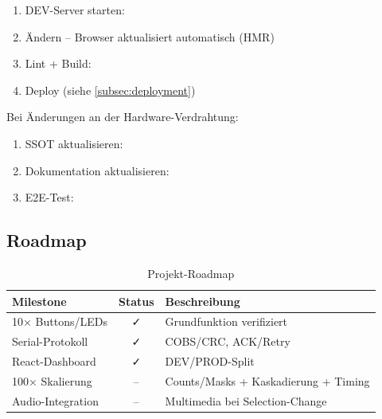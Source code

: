 \begin{infobox}
\begin{enumerate}
  \item DEV-Server starten: 
  \item Ändern -- Browser aktualisiert automatisch (HMR)
  \item Lint + Build: 
  \item Deploy (siehe \cref{subsec:deployment})
\end{enumerate}
\end{infobox}

\begin{warnbox}
Bei Änderungen an der Hardware-Verdrahtung:
\begin{enumerate}
  \item SSOT aktualisieren: 
  \item Dokumentation aktualisieren: 
  \item E2E-Test: 
\end{enumerate}
\end{warnbox}

\subsection{Roadmap}
\label{subsec:roadmap}

\begin{table}[H]
\centering
\caption{Projekt-Roadmap}
\label{tab:roadmap}
\begin{tabularx}{\textwidth}{@{}l c X@{}}
\toprule
\textbf{Milestone} & \textbf{Status} & \textbf{Beschreibung} \\
\midrule
10× Buttons/LEDs   & ✓  & Grundfunktion verifiziert \\
Serial-Protokoll   & ✓  & COBS/CRC, ACK/Retry \\
React-Dashboard    & ✓  & DEV/PROD-Split \\
100× Skalierung    & -- & Counts/Masks + Kaskadierung + Timing \\
Audio-Integration  & -- & Multimedia bei Selection-Change \\
\bottomrule
\end{tabularx}
\end{table}

